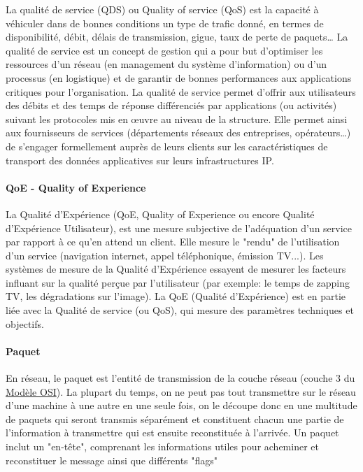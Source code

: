 \documentclass[french]{article}
\begin{document}
La qualité de service (QDS) ou Quality of service (QoS) est la capacité à véhiculer dans de bonnes conditions un type de trafic donné, en termes de disponibilité, débit, délais de transmission, gigue, taux de perte de paquets…
La qualité de service est un concept de gestion qui a pour but d’optimiser les ressources d'un réseau (en management du système d'information) ou d'un processus (en logistique) et de garantir de bonnes performances aux applications critiques pour l'organisation. La qualité de service permet d’offrir aux utilisateurs des débits et des temps de réponse différenciés par applications (ou activités) suivant les protocoles mis en œuvre au niveau de la structure.
Elle permet ainsi aux fournisseurs de services (départements réseaux des entreprises, opérateurs…) de s’engager formellement auprès de leurs clients sur les caractéristiques de transport des données applicatives sur leurs infrastructures IP.

\paragraph{QoE - Quality of Experience}

La Qualité d'Expérience (QoE, Quality of Experience ou encore Qualité d'Expérience Utilisateur), est une mesure subjective de l'adéquation d'un service par rapport à ce qu'en attend un client. Elle mesure le "rendu" de l'utilisation d'un service (navigation internet, appel téléphonique, émission TV...). Les systèmes de mesure de la Qualité d'Expérience essayent de mesurer les facteurs influant sur la qualité perçue par l'utilisateur (par exemple: le temps de zapping TV, les dégradations sur l'image).
La QoE (Qualité d'Expérience) est en partie liée avec la Qualité de service (ou QoS), qui mesure des paramètres techniques et objectifs.

\paragraph{Paquet}

En réseau, le paquet est l'entité de transmission de la couche réseau (couche 3 du \hyperlink{modele_osi}{Modèle OSI}).
La plupart du temps, on ne peut pas tout transmettre sur le réseau d'une machine à une autre en une seule fois, on le découpe donc en une multitude de paquets qui seront transmis séparément et constituent chacun une partie de l'information à transmettre qui est ensuite reconstituée à l'arrivée.
Un paquet inclut un "en-tête", comprenant les informations utiles pour acheminer et reconstituer le message ainsi que différents "flags" 
\end{document}
